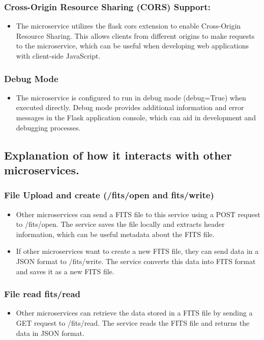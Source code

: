 \documentclass[a4paper,oneside,11pt]{book}
\begin{document}
\subsubsection{Cross-Origin Resource Sharing (CORS) Support:}
\begin{itemize}
    \item The microservice utilizes the flask cors extension to enable Cross-Origin Resource Sharing. This allows clients from different origins to make requests to the microservice, which can be useful when developing web applications with client-side JavaScript.
\end{itemize}
\subsubsection{Debug Mode}
\begin{itemize}
    \item The microservice is configured to run in debug mode (debug=True) when executed directly. Debug mode provides additional information and error messages in the Flask application console, which can aid in development and debugging processes.
\end{itemize}
\subsection{Explanation of how it interacts with other microservices.}
\subsubsection{File Upload and create ({/fits/open} and {fits/write})}
\begin{itemize}
    \item Other microservices can send a FITS file to this service using a POST request to {/fits/open}. The service saves the file locally and extracts header information, which can be useful metadata about the FITS file.
    \item If other microservices want to create a new FITS file, they can send data in a JSON format to {/fits/write}. The service converts this data into FITS format and saves it as a new FITS file.
\end{itemize}
\subsubsection{File read {fits/read}}
\begin{itemize}
    \item Other microservices can retrieve the data stored in a FITS file by sending a GET request to {/fits/read}. The service reads the FITS file and returns the data in JSON format.
\end{itemize}
\end{document}
